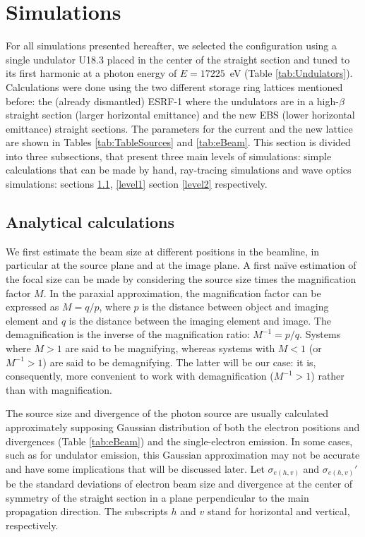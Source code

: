 \documentclass{iucr}              %
\begin{document}

\section{Simulations}
\label{Simulations}

For all simulations presented hereafter, we selected the configuration using a single undulator U18.3 placed in the center of the straight section and tuned to its first harmonic at a photon energy of $E=17225$~eV (Table \ref{tab:Undulators}). Calculations were done using the two different storage ring lattices mentioned before: the (already dismantled) ESRF-1 where the undulators are in a high-$\beta$ straight section (larger horizontal emittance) and the new EBS (lower horizontal emittance) straight sections. The parameters for the current and the new lattice are shown in Tables \ref{tab:TableSources} and \ref{tab:eBeam}.
This section is divided into three subsections, that present three main levels of simulations: simple calculations that can be made by hand, ray-tracing simulations and wave optics simulations: sections  \ref{level0}, \ref{level1} section \ref{level2} respectively.   

\subsection{Analytical calculations}
\label{level0}

We first estimate the beam size at different positions in the beamline, in particular at the source plane and at the image plane. A first na{\"{i}}ve estimation of the focal size can be made by considering the source size times the magnification factor $M$. In the paraxial approximation, the magnification factor can be expressed as $M=q/p$, where $p$ is the distance between object and imaging element and $q$ is the distance between the imaging element and image. The demagnification is the inverse of the magnification ratio: $M^{-1}=p/q$. Systems where $M>1$ are said to be magnifying, whereas systems with $M<1$ (or $M^{-1}>1$) are said to be demagnifying. The latter will be our case: it is, consequently, more convenient to work with demagnification ($M^{-1}>1$) rather than with magnification. 

The source size and divergence of the photon source are usually calculated approximately supposing Gaussian distribution of both the electron positions and divergences (Table \ref{tab:eBeam}) and the single-electron emission. In some cases, such as for undulator emission, this Gaussian approximation may not be accurate and have some implications that will be discussed later. Let $\sigma_{e(h,v)}$ and $\sigma_{e(h,v)}'$ be the standard deviations of electron beam size and divergence at the center of symmetry of the straight section in a plane perpendicular to the main propagation direction. The subscripts $h$ and $v$ stand for horizontal and vertical, respectively. 
\end{document}
